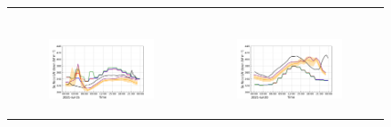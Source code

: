 \begin{figure}[hbtp]
\begin{tabular}{cc}
\begin{subfigure}[t]{0.5\textwidth}
        \end{subfigure} \\
        \begin{subfigure}[t]{0.5\textwidth}
            \caption{}
            \includegraphics[width=\textwidth]{images/chap6/IOP_TS/TS_2021-07-15_elsplans_LWdnSFC.png}
        \end{subfigure} &
        \begin{subfigure}[t]{0.5\textwidth}
            \caption{}
            \includegraphics[width=\textwidth]{images/chap6/IOP_TS/TS_2021-07-20_elsplans_LWdnSFC.png}
        \end{subfigure} 
    \end{tabular}
    \caption{}
    \label{fig:iop_days_TS_energy_elsplans}
\end{figure}

